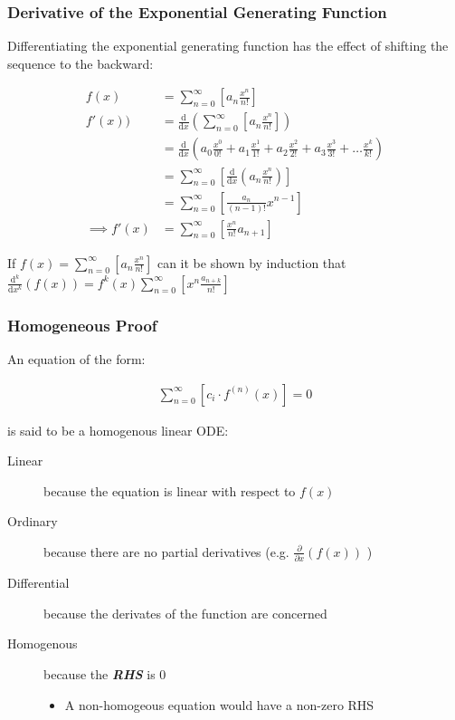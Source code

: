 \documentclass[11pt]{article}
\begin{document}
\subsubsection{Derivative of the Exponential Generating Function}
\label{sec:org92cf896}
Differentiating the exponential generating function has the effect of shifting the sequence to the backward: \cite{lehmanReadingsMathematicsComputer2010}

\begin{align}
    f\left( x \right) &= \sum^{\infty}_{n= 0}   \left[ a_n \frac{x^n}{n!} \right] \label{eq:exp-pow-series} \\
f'\left( x \right)) &= \frac{\mathrm{d} }{\mathrm{d} x}\left( \sum^{\infty}_{n= 0}   \left[ a_n \frac{x^n}{n!} \right]  \right) \nonumber \\
&= \frac{\mathrm{d}}{\mathrm{d} x} \left( a_0 \frac{x^0}{0!} +  a_1 \frac{x^1}{1!} +  a_2 \frac{x^2}{2!}+  a_3 \frac{x^3}{3! } +  \ldots \frac{x^k}{k!} \right) \nonumber \\
&= \sum^{\infty}_{n= 0}   \left[ \frac{\mathrm{d} }{\mathrm{d} x}\left( a_n \frac{x^n}{n!} \right) \right] \nonumber \\
&= \sum^{\infty}_{n= 0}   {\left[{ \frac{a_n}{{\left({ n- 1 }\right)!}} } x^{n- 1}  \right]} \nonumber \\
\implies f'(x) &= \sum^{\infty}_{n= 0}   {\left[{ \frac{x^n}{n!}a_{n+  1} }\right]} \label{eq:exp-pow-series-sol}
\end{align}

If \(f\left( x \right)= \sum^{\infty}_{n= 0 } \left[ a_n \frac{x^n}{n!} \right]\) can it be shown by induction that \(\frac{\mathrm{d}^k }{\mathrm{d} x^k} \left(  f\left( x \right) \right)= f^{k} \left( x \right) \sum^{\infty}_{n= 0}   \left[ x^n \frac{a_{n+  k}}{n!} \right]\)

\subsubsection{Homogeneous Proof}
\label{sec:orgf69b0f3}
An equation of the form:

\begin{align}
\sum^{\infty}_{n=0} \left[ c_{i} \cdot f^{(n)}(x) \right] = 0 \label{eq:hom-ode}
\end{align}

is said to be a homogenous linear ODE:

\begin{description}
\item[{Linear}] because the equation is linear with respect to \(f(x)\)
\item[{Ordinary}] because there are no partial derivatives (e.g. \(\frac{\partial }{\partial x}{\left({ f{\left({ x }\right)} }\right)}\)  )
\item[{Differential}] because the derivates of the function are concerned
\item[{Homogenous}] because the \textbf{\emph{RHS}} is 0
\begin{itemize}
\item A non-homogeous equation would have a non-zero RHS
\end{itemize}
\end{description}
\end{document}
